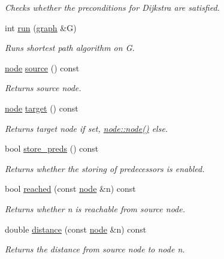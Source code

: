 \begin{DoxyCompactItemize}
\begin{DoxyCompactList}\small\item\em Checks whether the preconditions for Dijkstra are satisfied. \end{DoxyCompactList}\item 
int \mbox{\hyperlink{classdijkstra_a7b30f3d8ad42baae27989bc14befe0d0}{run}} (\mbox{\hyperlink{classgraph}{graph}} \&G)
\begin{DoxyCompactList}\small\item\em Runs shortest path algorithm on {\ttfamily G}. \end{DoxyCompactList}\item 
\mbox{\hyperlink{classnode}{node}} \mbox{\hyperlink{classdijkstra_a69772d19321b5e4deac66174ec546caa}{source}} () const
\begin{DoxyCompactList}\small\item\em Returns source node. \end{DoxyCompactList}\item 
\mbox{\hyperlink{classnode}{node}} \mbox{\hyperlink{classdijkstra_a4957ef4369386ef2153359ea97da9d88}{target}} () const
\begin{DoxyCompactList}\small\item\em Returns target node if set, {\ttfamily \mbox{\hyperlink{classnode_a6da4ea35f222059db9a59cf40be459f9}{node\+::node()}}} else. \end{DoxyCompactList}\item 
bool \mbox{\hyperlink{classdijkstra_a8ef3ee087994a56b774f48fd331725a3}{store\+\_\+preds}} () const
\begin{DoxyCompactList}\small\item\em Returns whether the storing of predecessors is enabled. \end{DoxyCompactList}\item 
bool \mbox{\hyperlink{classdijkstra_a405ff80abfc9ad98668534032eed6a5b}{reached}} (const \mbox{\hyperlink{classnode}{node}} \&n) const
\begin{DoxyCompactList}\small\item\em Returns whether {\ttfamily n} is reachable from source node. \end{DoxyCompactList}\item 
double \mbox{\hyperlink{classdijkstra_ae350a266dd47091d7f620a7328619426}{distance}} (const \mbox{\hyperlink{classnode}{node}} \&n) const
\begin{DoxyCompactList}\small\item\em Returns the distance from source node to node {\ttfamily n}. \end{DoxyCompactList}\item 

\end{DoxyCompactItemize}
